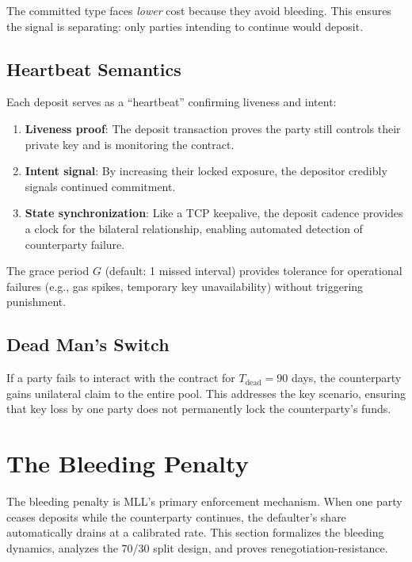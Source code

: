 \documentclass[12pt,a4paper]{article}
\begin{document}
The committed type faces \textit{lower} cost because they avoid bleeding. This ensures the signal is separating: only parties intending to continue would deposit.

\subsection{Heartbeat Semantics}

Each deposit serves as a ``heartbeat'' confirming liveness and intent:

\begin{enumerate}
\item \textbf{Liveness proof}: The deposit transaction proves the party still controls their private key and is monitoring the contract.
\item \textbf{Intent signal}: By increasing their locked exposure, the depositor credibly signals continued commitment.
\item \textbf{State synchronization}: Like a TCP keepalive, the deposit cadence provides a clock for the bilateral relationship, enabling automated detection of counterparty failure.
\end{enumerate}

The grace period $G$ (default: 1 missed interval) provides tolerance for operational failures (e.g., gas spikes, temporary key unavailability) without triggering punishment.

\subsection{Dead Man's Switch}

If a party fails to interact with the contract for $T_{\text{dead}} = 90$ days, the counterparty gains unilateral claim to the entire pool. This addresses the key scenario, ensuring that key loss by one party does not permanently lock the counterparty's funds.



\section{The Bleeding Penalty}
\label{sec:bleeding}

The bleeding penalty is MLL's primary enforcement mechanism. When one party ceases deposits while the counterparty continues, the defaulter's share automatically drains at a calibrated rate. This section formalizes the bleeding dynamics, analyzes the 70/30 split design, and proves renegotiation-resistance.
\end{document}
